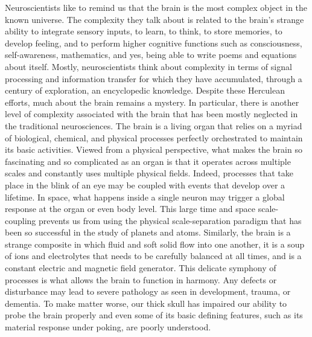 %
%

\foreword




Neuroscientists like to remind us that the brain is the most complex
object in the known universe. The complexity they talk about is
related to the brain's strange ability to integrate sensory inputs, to
learn, to think, to store memories, to develop feeling, and to perform
higher cognitive functions such as consciousness, self-awareness,
mathematics, and yes, being able to write poems and equations about
itself. Mostly, neuroscientists think about complexity in terms of
signal processing and information transfer for which they have
accumulated, through a century of exploration, an encyclopedic
knowledge. Despite these Herculean efforts, much about the brain
remains a mystery. In particular, there is another level of complexity
associated with the brain that has been mostly neglected in the
traditional neurosciences. The brain is a living organ that relies on
a myriad of biological, chemical, and physical processes perfectly
orchestrated to maintain its basic activities. Viewed from a physical
perspective, what makes the brain so fascinating and so complicated as
an organ is that it operates across multiple scales and constantly
uses multiple physical fields. Indeed, processes that take place in
the blink of an eye may be coupled with events that develop over a
lifetime. In space, what happens inside a single neuron may trigger a
global response at the organ or even body level. This large time and
space scale-coupling prevents us from using the physical
scale-separation paradigm that has been so successful in the study of
planets and atoms. Similarly, the brain is a strange composite in
which fluid and soft solid flow into one another, it is a soup of ions
and electrolytes that needs to be carefully balanced at all times, and
is a constant electric and magnetic field generator. This delicate
symphony of processes is what allows the brain to function in
harmony. Any defects or disturbance may lead to severe pathology as
seen in development, trauma, or dementia. To make matter worse, our
thick skull has impaired our ability to probe the brain properly and
even some of its basic defining features, such as its material
response under poking, are poorly understood.

